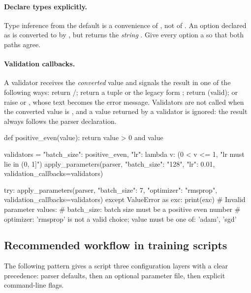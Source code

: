 \paragraph{Declare types explicitly.}
Type inference from the default is a convenience of , not of
. An option declared as  is converted to  by , but
 returns the \emph{string}
. Give every option a  so that both paths agree.

\paragraph{Validation callbacks.}
A validator receives the \emph{converted} value and signals the result in one
of the following ways: return /; return a tuple
 or the legacy form ; return  (valid); or raise
 or , whose text becomes the error message.
Validators are not called when the converted value is , and a value
returned by a validator is ignored: the result always follows the parser
declaration.

\begin{pycode}
def positive_even(value):
    return value > 0 and value %

validators = {"batch_size": positive_even,
              "lr": lambda v: (0 < v <= 1, "lr must lie in (0, 1]")}
apply_parameters(parser, {"batch_size": "128", "lr": 0.01},
                 validation_callbacks=validators)

try:
    apply_parameters(parser, {"batch_size": 7, "optimizer": "rmsprop"},
                     validation_callbacks=validators)
except ValueError as exc:
    print(exc)
# Invalid parameter values:
# batch_size: batch size must be a positive even number
# optimizer: 'rmsprop' is not a valid choice; value must be one of: 'adam', 'sgd'
\end{pycode}

\subsection{Recommended workflow in training scripts}\label{sec:parakit-workflow}

The following pattern gives a script three configuration layers with a clear
precedence: parser defaults, then an optional parameter file, then explicit
command-line flags.

